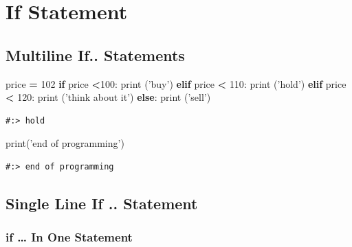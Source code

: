 \documentclass[
]{book}
\newenvironment{Shaded}{\begin{snugshade}}{\end{snugshade}}
\newcommand{\BuiltInTok}[1]{#1}
\newcommand{\ControlFlowTok}[1]{\textcolor[rgb]{0.27,0.27,0.27}{\textbf{#1}}}
\newcommand{\DecValTok}[1]{\textcolor[rgb]{0.06,0.06,0.06}{#1}}
\newcommand{\NormalTok}[1]{#1}
\newcommand{\OperatorTok}[1]{\textcolor[rgb]{0.43,0.43,0.43}{\textbf{#1}}}
\newcommand{\StringTok}[1]{\textcolor[rgb]{0.5,0.5,0.5}{#1}}
\begin{document}
\hypertarget{if-statement}{%
\section{If Statement}\label{if-statement}}

\hypertarget{multiline-if..-statements}{%
\subsection{Multiline If.. Statements}\label{multiline-if..-statements}}

\begin{Shaded}
\begin{Highlighting}[]
\NormalTok{price }\OperatorTok{=} \DecValTok{102}
\ControlFlowTok{if}\NormalTok{ price }\OperatorTok{<}\DecValTok{100}\NormalTok{:}
    \BuiltInTok{print}\NormalTok{ (}\StringTok{'buy'}\NormalTok{)}
\ControlFlowTok{elif}\NormalTok{ price }\OperatorTok{<} \DecValTok{110}\NormalTok{:}
    \BuiltInTok{print}\NormalTok{ (}\StringTok{'hold'}\NormalTok{)}
\ControlFlowTok{elif}\NormalTok{ price }\OperatorTok{<} \DecValTok{120}\NormalTok{:}
    \BuiltInTok{print}\NormalTok{ (}\StringTok{'think about it'}\NormalTok{)}
\ControlFlowTok{else}\NormalTok{:}
    \BuiltInTok{print}\NormalTok{ (}\StringTok{'sell'}\NormalTok{)}
\end{Highlighting}
\end{Shaded}

\begin{verbatim}
#:> hold
\end{verbatim}

\begin{Shaded}
\begin{Highlighting}[]
\BuiltInTok{print}\NormalTok{(}\StringTok{'end of programming'}\NormalTok{)}
\end{Highlighting}
\end{Shaded}

\begin{verbatim}
#:> end of programming
\end{verbatim}

\hypertarget{single-line-if-..-statement}{%
\subsection{Single Line If .. Statement}\label{single-line-if-..-statement}}

\hypertarget{if-in-one-statement}{%
\subsubsection{if \ldots{} In One Statement}\label{if-in-one-statement}}
\end{document}
